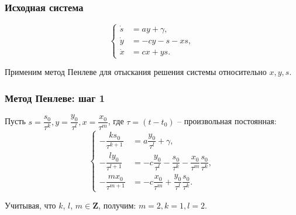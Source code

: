 \documentclass[hyperref={pdftex,unicode}]{beamer}
\begin{document}
\begin{frame}

\frametitle{Исходная система}

$$
        \left\{
                \begin{aligned}
                        \dot s &= ay + \gamma , \\
                        \dot y &= -cy -s -xs , \\
                        \dot x &= cx + ys .
                \end{aligned}
        \right. 
$$

\vspace{20pt}

Применим метод Пенлеве для отыскания решения системы относительно $ x, y, s $.

\end{frame}



\begin{frame}

\frametitle{Метод Пенлеве: шаг 1}

Пусть $ s = \dfrac{s_0}{\tau^k}, y = \dfrac{y_0}{\tau^l} , x = \dfrac{x_0}{\tau^m} $, 
\vspace{5pt}
где $ \tau = (t - t_0) $ -- произвольная постоянная:
$$    
         \left\{
                \begin{aligned}
                        -\dfrac{ks_0}{\tau^{k+1}} &= a \dfrac{y_0}{\tau^l} + \gamma , \\
                        -\dfrac{ly_0}{\tau^{l+1}} &= -c \dfrac{y_0}{\tau^l} - \dfrac{s_0}{\tau^k} - \dfrac{x_0}{\tau^m} \dfrac{s_0}{\tau^k} , \\
                        -\dfrac{mx_0}{\tau^{m+1}} &= -c \dfrac{x_0}{\tau^m} + \dfrac{y_0}{\tau^l} \dfrac{s_0}{\tau^k} .
                \end{aligned}
        \right.
$$

\vspace{20pt}

Учитывая, что $ k $, $ l $, $ m \in \textbf{Z} $, получим: $ m = 2, k = 1, l = 2 $.


\end{frame}
\end{document}
